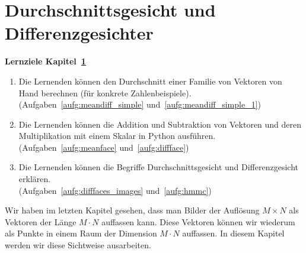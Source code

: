 \section{Durchschnittsgesicht und Differenzgesichter} \label{sec:facespace}
\begin{tcolorbox}
	\centerline{\textbf{Lernziele Kapitel~\ref{sec:facespace}}}
	\begin{enumerate}[leftmargin=*,label=\thesection.\arabic*]
		\item \label{item:meandiff_simple} Die Lernenden können den Durchschnitt einer Familie von Vektoren von Hand berechnen (für konkrete Zahlenbeispiele).\\
		(Aufgaben~\ref{aufg:meandiff_simple} und~\ref{aufg:meandiff_simple_1})
		\item \label{item:meanface} Die Lernenden können die Addition und Subtraktion von Vektoren und deren Multiplikation mit einem Skalar in Python ausführen.\\
		(Aufgaben~\ref{aufg:meanface} und~\ref{aufg:diffface})
		\item \label{item:hmmc} Die Lernenden können die Begriffe Durchschnittsgesicht und Differenzgesicht erklären.\\
		(Aufgaben~\ref{aufg:difffaces_images} und~\ref{aufg:hmmc})
	\end{enumerate}
\end{tcolorbox}
Wir haben im letzten Kapitel gesehen, dass man Bilder der Auflösung $M\times N$ als Vektoren der Länge $M\cdot N$ auffassen kann.
Diese Vektoren können wir wiederum als Punkte in einem Raum der Dimension $M\cdot N$ auffassen.
In diesem Kapitel werden wir diese Sichtweise ausarbeiten.

